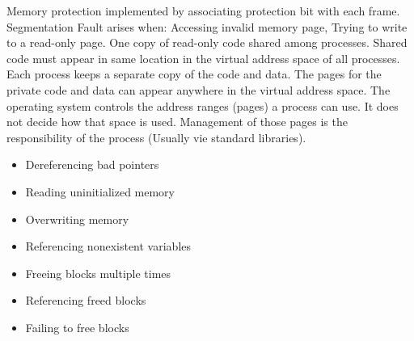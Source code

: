\documentclass[number]{notes}
\begin{document}
\begin{landscape}
\begin{multicols}{3}
Memory protection implemented by associating protection bit with each frame.
Segmentation Fault arises when: Accessing invalid memory page, Trying to write to a read-only page.
One copy of read-only code shared among processes. Shared code must appear in same location in the virtual address space of all processes.\\
Each process keeps a separate copy of the code and data. The pages for the private code and data can appear anywhere in the virtual address space.
The operating system controls the address ranges (pages) a process can use. It does not decide how that space is used. Management of those pages is the responsibility of the process (Usually vie standard libraries).

\begin{itemize}
    \item Dereferencing bad pointers
    \item Reading uninitialized memory
    \item Overwriting memory
    \item Referencing nonexistent variables
    \item Freeing blocks multiple times
    \item Referencing freed blocks
    \item Failing to free blocks
\end{itemize}


\end{multicols}
\end{landscape}
\end{document}
